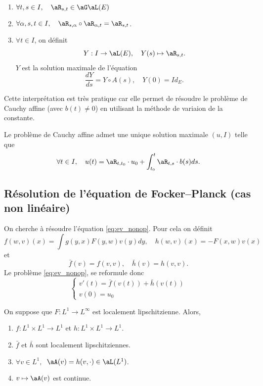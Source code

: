 \begin{prop}{}{}
	\begin{enumerate}
		\item $\forall t,s \in I, \quad \aR_{s,t} \in \aG\aL(E)$
		\item $\forall \alpha, s, t \in I, \quad \aR_{s,\alpha} \circ \aR_{\alpha, t} = \aR_{s,t}$.
		\item $\forall t \in I$, on définit
		      \[
			      Y : I \to \aL(E), \quad Y(s) \mapsto \aR_{s,t}.
		      \]
		      $Y$ est la solution maximale de l'équation
		      \[
			      \frac{dY}{ds} = Y \circ A(s), \quad Y(0) = Id_E.
		      \]
	\end{enumerate}
\end{prop}

Cette interprétation est très pratique car elle permet de résoudre le problème de Cauchy affine (avec $b(t) \neq 0$) en utilisant la méthode
de variaion de la constante.

\begin{prop}{}{}
	Le problème de Cauchy affine admet une unique solution maximale $(u, I)$ telle que
	\[
		\forall t \in I, \quad u(t) = \aR_{t,t_0} \cdot u_0 + \int_{t_0}^t \aR_{t,s}\cdot b(s) ds.
	\]
\end{prop}

\subsection{Résolution de l'équation de Focker--Planck (cas non linéaire)}

On cherche à résoudre l'équation \ref{eq:ev_nonop}. Pour cela on définit
\[
	f(w,v)(x) = \int g(y,x) F(y,w) v(y) dy, \quad h(w,v)(x) = -F(x,w)v(x)
\]
et
\[
	\bar{f}(v) = f(v,v), \quad \bar{h}(v) = h(v,v).
\]
Le problème \ref{eq:ev_nonop}, se reformule donc
\begin{equation}
	\begin{cases}
		v'(t) = \bar{f}(v(t)) + \bar{h}(v(t)) \\
		v(0) = u_0
	\end{cases}
	\label{eq:ev_new}
\end{equation}

\begin{prop}{}{}
	On suppose que $F : L^1 \to L^\infty$ est localement lipschitzienne. Alors,
	\begin{enumerate}
		\item $f : L^1 \times L^1 \to L^1$ et $h : L^1 \times L^1 \to L^1$.
		\item $\bar f$ et $\bar h$ sont localement lipschitziennes.
		\item $\forall v \in L^1, \ $ $\aA(v) = h(v, \cdot) \in \aL(L^1)$.
		\item $v \mapsto \aA(v)$ est continue.
	\end{enumerate}
\end{prop}

